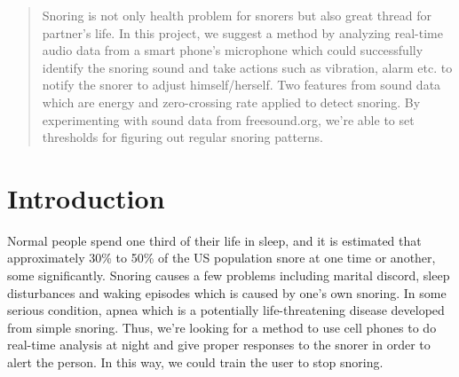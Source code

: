 \documentclass[conference]{IEEEtran}
\begin{document}
\begin{abstract}
Snoring is not only health problem for snorers but also great thread for partner’s life. In this project, we suggest a method by analyzing real-time audio data from a smart phone’s microphone which could successfully identify the snoring sound and take actions such as vibration, alarm etc. to notify the snorer to adjust himself/herself. Two features from sound data which are energy and zero-crossing rate applied to detect snoring.  By experimenting with sound data from freesound.org, we’re able to set thresholds for figuring out regular snoring patterns. 

\end{abstract}





%
\IEEEpeerreviewmaketitle



\section{Introduction}

Normal people spend one third of their life in sleep, and it is estimated that approximately 30\% to 50\% of the US population snore at one time or another, some significantly. Snoring causes a few problems including marital discord, sleep disturbances and waking episodes which is caused by one's own snoring\cite{aaoms:2013}. In some serious condition, apnea which is a potentially life-threatening disease developed from simple snoring. Thus, we're looking for a method to use cell phones to do real-time analysis at night and give proper responses to the snorer in order to alert the person. In this way, we could train the user to stop snoring.  \\
\end{document}
